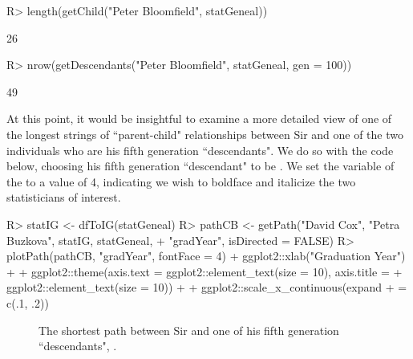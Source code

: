 \documentclass[article,shortnames]{jss}
\begin{document}
\begin{CodeChunk}
\begin{CodeInput}
R> length(getChild("Peter Bloomfield", statGeneal))
\end{CodeInput}
\begin{CodeOutput}
[1] 26
\end{CodeOutput}
\begin{CodeInput}
R> nrow(getDescendants("Peter Bloomfield", statGeneal, gen = 100))
\end{CodeInput}
\begin{CodeOutput}
[1] 49
\end{CodeOutput}
\end{CodeChunk}

At this point, it would be insightful to examine a more detailed view of one of the longest strings of ``parent-child" relationships between Sir  and one of the two individuals who are his fifth generation ``descendants". We do so with the code below, choosing his fifth generation ``descendant" to be . We set the  variable of the  to a value of 4, indicating we wish to boldface and italicize the two statisticians of interest.

\begin{CodeChunk}
\begin{CodeInput}
R> statIG <- dfToIG(statGeneal)
R> pathCB <- getPath("David Cox", "Petra Buzkova", statIG, statGeneal,
+    "gradYear", isDirected = FALSE)
R> plotPath(pathCB, "gradYear", fontFace = 4) + ggplot2::xlab("Graduation Year") +
+    ggplot2::theme(axis.text = ggplot2::element_text(size = 10), axis.title =
+    ggplot2::element_text(size = 10)) + + ggplot2::scale_x_continuous(expand
+    = c(.1, .2))
\end{CodeInput}
\end{CodeChunk}

\begin{figure}[H]
    \centering
    \caption{The shortest path between Sir  and one of his fifth generation ``descendants", .}
    \label{fig:pathCB}
\end{figure}
\end{document}
